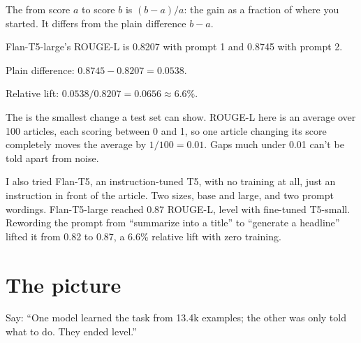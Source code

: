 \begin{definition}
The  from score $a$ to score $b$ is $(b - a)/a$: the gain as a fraction of where you started. It differs from the plain difference $b - a$.
\end{definition}

\begin{example}[Your 6.6\%]
Flan-T5-large's ROUGE-L is 0.8207 with prompt 1 and 0.8745 with prompt 2.
\begin{steps}
  \item Plain difference: $0.8745 - 0.8207 = 0.0538$.
  \item Relative lift: $0.0538 / 0.8207 = 0.0656 \approx 6.6\%$.
\end{steps}
\end{example}

\begin{definition}
The  is the smallest change a test set can show. ROUGE-L here is an average over 100 articles, each scoring between 0 and 1, so one article changing its score completely moves the average by $1/100 = 0.01$. Gaps much under 0.01 can't be told apart from noise.
\end{definition}

\begin{sayit}
I also tried Flan-T5, an instruction-tuned T5, with no training at all, just an instruction in front of the article. Two sizes, base and large, and two prompt wordings. Flan-T5-large reached 0.87 ROUGE-L, level with fine-tuned T5-small. Rewording the prompt from ``summarize into a title'' to ``generate a headline'' lifted it from 0.82 to 0.87, a 6.6\% relative lift with zero training.
\end{sayit}

\section{The picture}

\begin{sayit}
\begin{pic}
\end{pic}
Say: ``One model learned the task from 13.4k examples; the other was only told what to do. They ended level.''
\end{sayit}

